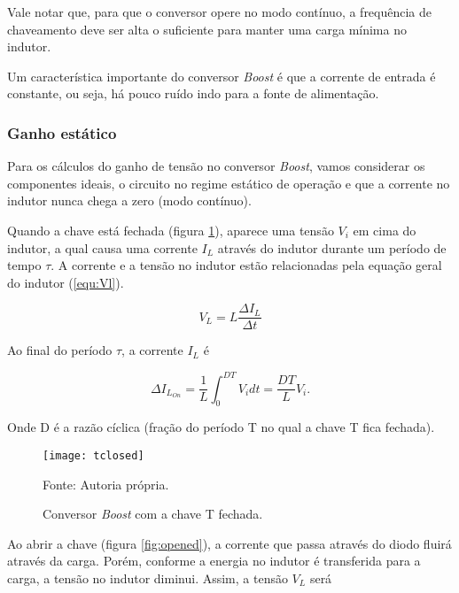 Vale notar que, para que o conversor opere no modo contínuo, a frequência de chaveamento deve ser alta o suficiente para manter uma carga mínima no indutor.

Um característica importante do conversor \textit{Boost} é que a corrente de entrada é constante, ou seja, há pouco ruído indo para a fonte de alimentação.

\subsubsection{Ganho estático}

    Para os cálculos do ganho de tensão no conversor \textit{Boost}, vamos considerar os componentes ideais, o circuito no regime estático de operação e que a corrente no indutor nunca chega a zero (modo contínuo).
    
    Quando a chave está fechada (figura \ref{fig:tclosed}), aparece uma tensão $V_i$ em cima do indutor, a qual causa uma corrente $I_L$ através do indutor durante um período de tempo $\tau$. A corrente e a tensão no indutor estão relacionadas pela equação geral do indutor (\ref{equ:Vl}).
    
    \begin{equation}
        V_L = L\frac{\Delta I_L}{\Delta t}
        \label{equ:Vl}
    \end{equation}

    Ao final do período $\tau$, a corrente $I_L$ é
    
    \begin{equation}
        \Delta I_{L_{On}}=\frac{1}{L}\int_0^{D T}V_i d t=\frac{D T}{L} V_i.
        \label{equ:ilon}
    \end{equation}
    
    Onde D é a razão cíclica (fração do período T no qual a chave T fica fechada).

    \begin{figure}[H]
        \centering
        \caption{Conversor \textit{Boost} com a chave T fechada.}
        \texttt{[image: tclosed]}
        \label{fig:tclosed}
        
        \small Fonte: Autoria própria.
    \end{figure}

    Ao abrir a chave (figura \ref{fig:opened}), a corrente que passa através do diodo fluirá através da carga. Porém, conforme a energia no indutor é transferida para a carga, a tensão no indutor diminui. Assim, a tensão $V_L$ será

